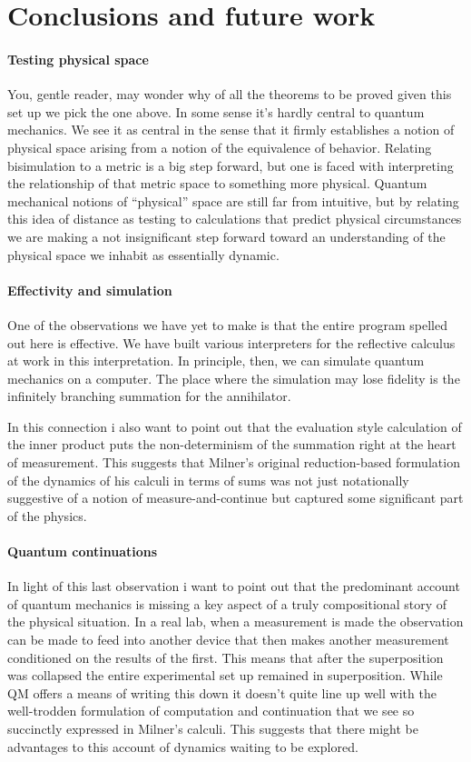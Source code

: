 \section{Conclusions and future work}

\paragraph{Testing physical space}
You, gentle reader, may wonder why of all the theorems to be proved
given this set up we pick the one above. In some sense it's hardly
central to quantum mechanics. We see it as central in the sense that
it firmly establishes a notion of physical space arising from a notion
of the equivalence of behavior. Relating bisimulation to a metric is a
big step forward, but one is faced with interpreting the relationship
of that metric space to something more physical. Quantum mechanical
notions of ``physical'' space are still far from intuitive, but by
relating this idea of distance as testing to calculations that predict
physical circumstances we are making a not insignificant step forward
toward an understanding of the physical space we inhabit as
essentially dynamic.

\paragraph{Effectivity and simulation}
One of the observations we have yet to make is that the entire program
spelled out here is effective. We have built various interpreters for
the reflective calculus at work in this interpretation. In principle,
then, we can simulate quantum mechanics on a computer. The place where
the simulation may lose fidelity is the infinitely branching summation
for the annihilator.

In this connection i also want to point out that the evaluation style
calculation of the inner product puts the non-determinism of the
summation right at the heart of measurement. This suggests that
Milner's original reduction-based formulation of the dynamics of his
calculi in terms of sums was not just notationally suggestive of a
notion of measure-and-continue but captured some significant part of
the physics.

\paragraph{Quantum continuations}
In light of this last observation i want to point out that the
predominant account of quantum mechanics is missing a key aspect of a
truly compositional story of the physical situation. In a real lab,
when a measurement is made the observation can be made to feed into
another device that then makes another measurement conditioned on the
results of the first. This means that after the superposition was
collapsed the entire experimental set up remained in
superposition. While QM offers a means of writing this down it doesn't
quite line up well with the well-trodden formulation of computation
and continuation that we see so succinctly expressed in Milner's
calculi. This suggests that there might be advantages to this account
of dynamics waiting to be explored.


